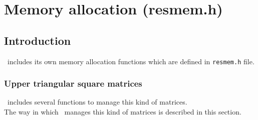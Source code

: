 %
%

\chapter{Memory allocation (resmem.h)}

\section{Introduction}

\BI\ includes its own memory allocation functions which are defined in \texttt{resmem.h} file.

\subsection{Upper triangular square matrices}

\BI \ includes several functions to manage this kind of matrices.\\

The way in which \BI \ manages this kind of matrices is described in this section.\\

